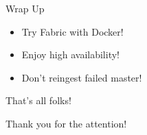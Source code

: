 \documentclass{beamer}[10]
\begin{document}

\begin{pyframe}{Wrap Up}
\begin{itemize}
\item Try Fabric with Docker!
\item Enjoy high availability!
\item Don't reingest failed master!
\end{itemize}
\end{pyframe}


\begin{pyframe}{That's all folks!}
\begin{center}
Thank you for the attention! \\\\
\insertauthor
\end{center}
\end{pyframe}
\end{document}
